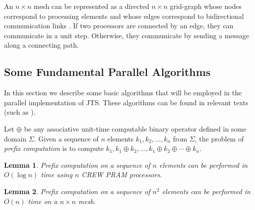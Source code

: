 \documentclass[10pt, conference, compsocconf]{IEEEtran}
\newtheorem{lemma}{Lemma}
\begin{document}

An $n \times n$ mesh can be represented as a directed $n\times n$ grid-graph whose nodes correspond to processing elements and whose edges correspond to bidirectional communication links \cite{leighton2014introduction,horowitz2008computer}.  If two processors are connected by an edge, they can communicate in a unit step. Otherwise, they communicate by sending a message along a connecting path.


\subsection{Some Fundamental Parallel Algorithms}
In this section we  describe some basic algorithms that will be employed in the parallel implementation of JTS. These algorithms can be found in relevant texts (such as \cite{horowitz2008computer,jaja1992introduction,leighton2014introduction}).

Let $\oplus$ be any associative unit-time computable binary operator defined in some domain $\Sigma$. Given a sequence of $n$ elements $k_1,k_2,\ldots,k_n$ from $\Sigma$, the problem of {\em prefix computation} is to compute $k_1,k_1\oplus k_2,
\ldots,k_1\oplus k_2\oplus\cdots \oplus k_n$.

\begin{lemma}
\label{prefix1}
Prefix computation on a sequence of $n$ elements can be performed in
$O(\log n)$ time using $n$ CREW PRAM processors.
\end{lemma}

\begin{lemma}
\label{prefix2}
Prefix computation on a sequence of $n^2$ elements can be performed in
$O(n)$ time on a $n\times n$ mesh. 
\end{lemma}
\end{document}
